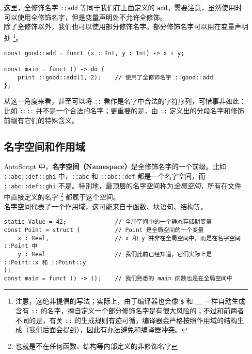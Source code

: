 这里，全修饰名字 \lstinline!::add! 等同于我们在上面定义的 \lstinline!add!。需要注意，虽然使用时可以使用全修饰名字，但是变量声明处不允许全修饰。 \\

除了全修饰以外，我们也可以使用部分修饰名字。部分修饰名字可以用在变量声明处 \footnote{注意，这绝非提倡的写法；实际上，由于编译器也会像 \texttt{\$} 和 \texttt{\_\_} 一样自动生成含有 \texttt{::} 的名字，擅自定义一个部分修饰名字是有很大风险的；不过和前两者不同的是，有关 \texttt{::} 的生成规则有迹可循，编译器会严格按照作用域的结构生成（我们后面会提到），因此有办法避免和编译器冲突。}。

\begin{minipage}[c]{0.95\textwidth}
\vspace{1.0em}
\begin{lstlisting}
const good::add = funct (x : Int, y : Int) -> x + y;

const main = funct () -> do {
	print ::good::add(1, 2);	// 使用了全修饰名字 ::good::add
};
\end{lstlisting}
\end{minipage}


从这一角度来看，甚至可以将 \texttt{::} 看作是名字中合法的字符序列，可惜事非如此：比如 \texttt{::::} 并不是一个合法的名字；更重要的是，由 \texttt{::} 定义出的分段名字和修饰前缀有它们的特殊含义。

\subsection{名字空间和作用域}

AutoScript 中，\textbf{名字空间（Namespace）}是全修饰名字的一个前缀。比如 \texttt{::abc::def::ghi} 中，\texttt{::abc} 和 \texttt{::abc::def} 都是一个名字空间，而 \texttt{::abc::def::ghi} 不是。特别地，最顶层的名字空间称为\emph{全局空间}，所有在文件中直接定义的名字 \footnote{也就是不在任何函数、结构等内部定义的非修饰名字} 都属于这个空间。 \\

名字空间代表了一个作用域，这可能来自于函数、块语句、结构等。

\begin{lstlisting}
static Value = 42;				// 全局空间中的一个静态存储期变量
const Point = struct (			// Point 是全局空间的一个变量
	x : Real,					// x 和 y 并非在全局空间中，而是在名字空间 ::Point 中
	y : Real					// 我们此前已经知道，它们实际上是 ::Point::x 和 ::Point::y
);
const main = funct () -> ();	// 我们熟悉的 main 函数也是在全局空间中
\end{lstlisting}

